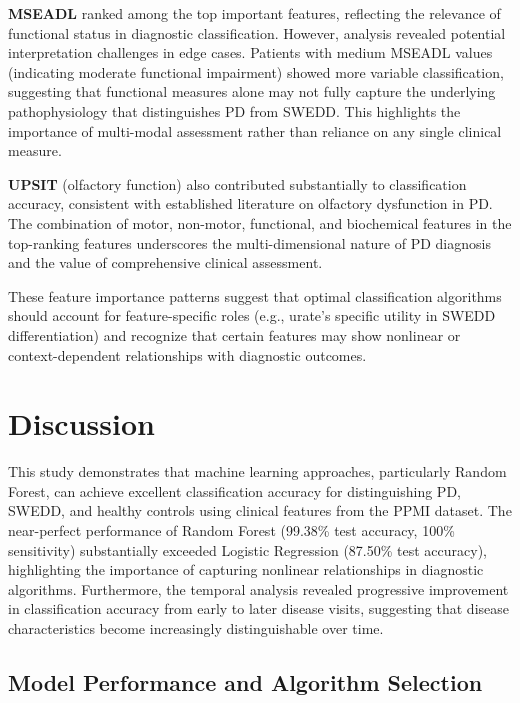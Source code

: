 \documentclass[12pt,a4paper]{article}
\begin{document}
\textbf{MSEADL} ranked among the top important features, reflecting the relevance of functional status in diagnostic classification. However, analysis revealed potential interpretation challenges in edge cases. Patients with medium MSEADL values (indicating moderate functional impairment) showed more variable classification, suggesting that functional measures alone may not fully capture the underlying pathophysiology that distinguishes PD from SWEDD. This highlights the importance of multi-modal assessment rather than reliance on any single clinical measure.

\textbf{UPSIT} (olfactory function) also contributed substantially to classification accuracy, consistent with established literature on olfactory dysfunction in PD. The combination of motor, non-motor, functional, and biochemical features in the top-ranking features underscores the multi-dimensional nature of PD diagnosis and the value of comprehensive clinical assessment.

These feature importance patterns suggest that optimal classification algorithms should account for feature-specific roles (e.g., urate's specific utility in SWEDD differentiation) and recognize that certain features may show nonlinear or context-dependent relationships with diagnostic outcomes.

\section{Discussion}

This study demonstrates that machine learning approaches, particularly Random Forest, can achieve excellent classification accuracy for distinguishing PD, SWEDD, and healthy controls using clinical features from the PPMI dataset. The near-perfect performance of Random Forest (99.38\% test accuracy, 100\% sensitivity) substantially exceeded Logistic Regression (87.50\% test accuracy), highlighting the importance of capturing nonlinear relationships in diagnostic algorithms. Furthermore, the temporal analysis revealed progressive improvement in classification accuracy from early to later disease visits, suggesting that disease characteristics become increasingly distinguishable over time.

\subsection*{Model Performance and Algorithm Selection}
\end{document}
